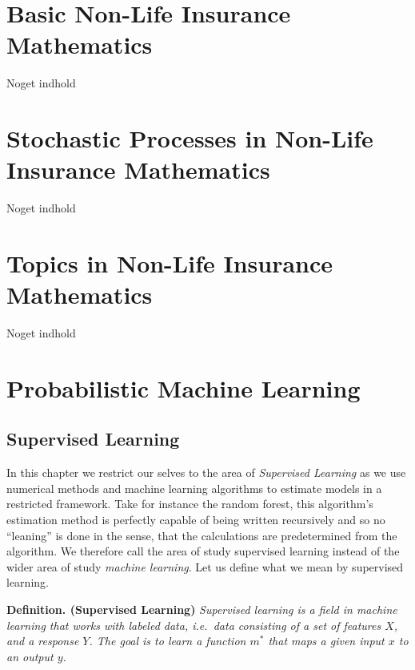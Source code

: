 \documentclass[
]{book}
\begin{document}
\hypertarget{basic-non-life-insurance-mathematics}{%
\chapter{Basic Non-Life Insurance Mathematics}\label{basic-non-life-insurance-mathematics}}

Noget indhold

\hypertarget{stochastic-processes-in-non-life-insurance-mathematics}{%
\chapter{Stochastic Processes in Non-Life Insurance Mathematics}\label{stochastic-processes-in-non-life-insurance-mathematics}}

Noget indhold

\hypertarget{topics-in-non-life-insurance-mathematics}{%
\chapter{Topics in Non-Life Insurance Mathematics}\label{topics-in-non-life-insurance-mathematics}}

Noget indhold

\hypertarget{probabilistic-machine-learning}{%
\chapter{Probabilistic Machine Learning}\label{probabilistic-machine-learning}}

\hypertarget{supervised-learning}{%
\section{Supervised Learning}\label{supervised-learning}}

In this chapter we restrict our selves to the area of \emph{Supervised Learning} as we use numerical methods and machine learning algorithms to estimate models in a restricted framework. Take for instance the random forest, this algorithm's estimation method is perfectly capable of being written recursively and so no ``leaning'' is done in the sense, that the calculations are predetermined from the algorithm. We therefore call the area of study supervised learning instead of the wider area of study \emph{machine learning}. Let us define what we mean by supervised learning.

\textbf{Definition. (Supervised Learning)} \emph{Supervised learning is a field in machine learning that works with labeled data, i.e.~data consisting of a set of features \(X\), and a response \(Y\). The goal is to learn a function \(m^*\) that maps a given input \(x\) to an output \(y\).}
\end{document}
